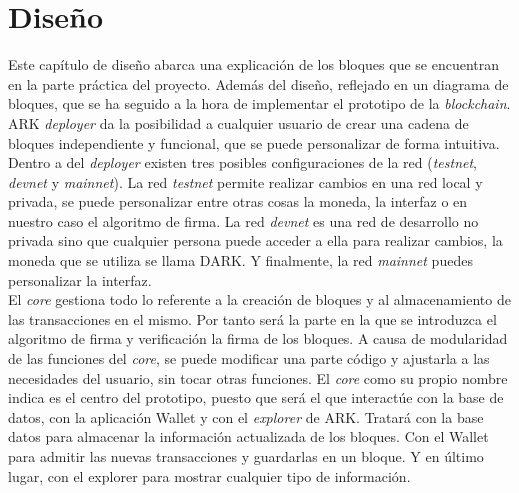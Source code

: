 \chapter{Diseño}
\label{sec:diseno}



Este capítulo de diseño abarca una explicación de los bloques que se encuentran en la parte práctica del proyecto. Además del diseño, reflejado en un diagrama de bloques, que se ha seguido a la hora de implementar el prototipo de la \textit{blockchain}.\\

ARK \textit{deployer} \cite{deployer} da la posibilidad a cualquier usuario de crear una cadena de bloques independiente y funcional, que se puede personalizar de forma intuitiva. Dentro a del \textit{deployer} existen tres posibles configuraciones de la red (\textit{testnet}, \textit{devnet} y \textit{mainnet}). La red \textit{testnet} permite realizar cambios en una red local y privada, se puede personalizar entre otras cosas la moneda, la interfaz o en nuestro caso el algoritmo de firma. La red \textit{devnet} es una red de desarrollo no privada sino que cualquier persona puede acceder a ella para realizar cambios, la moneda que se utiliza se llama DARK. Y finalmente, la red \textit{mainnet} puedes personalizar la interfaz. \\

El \textit{core} gestiona todo lo referente a la creación de bloques y al almacenamiento de las transacciones en el mismo. Por tanto será la parte en la que se introduzca el algoritmo de firma y verificación la firma de los bloques. A causa de modularidad de las funciones del \textit{core}, se puede modificar una parte código y ajustarla a las necesidades del usuario, sin tocar otras funciones. El \textit{core} como su propio nombre indica es el centro del prototipo, puesto que será el que interactúe con la base de datos, con la aplicación Wallet y con el \textit{explorer} de ARK. Tratará con la base datos para almacenar la información actualizada de los bloques. Con el Wallet para admitir las nuevas transacciones y guardarlas en un bloque. Y en último lugar, con el explorer para mostrar cualquier tipo de información.\\

